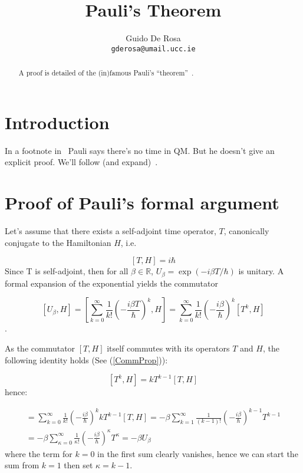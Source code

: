 \documentclass[a4paper,12pt]{article}
\author{Guido De Rosa \\ \small\tt{gderosa@umail.ucc.ie}}
\title{Pauli's Theorem}
\begin{document}
\maketitle

\begin{abstract}
A proof is detailed of the (in)famous Pauli's ``theorem''~\cite[footnote~2]{PauliFootnote}.
\end{abstract}

\section{Introduction}

In a footnote in~\cite{PauliFootnote} Pauli says there's no time in QM. But he
doesn't give an explicit proof. We'll follow (and expand)~\cite{Galapon2002}.

\section{Proof of Pauli's formal argument}\label{proof}

Let's assume that there exists a self-adjoint time operator, $T$, canonically conjugate
to the Hamiltonian $H$, i.e.

$$
\label{THcommutator}
[T, H] = i\hbar
$$
Since T is self-adjoint, then for all
$\beta\in\mathbb{R}$, $U_{\beta} = \exp(- i \beta T / \hbar)$
is unitary. A formal
expansion of the exponential yields the commutator

$$
[U_{\beta}, H]  = 
\left[
    \sum_{k=0}^{\infty} \frac{1}{k!} \left(- \frac{i\beta T}{\hbar} \right)^k, H
\right]         =
\sum_{k=0}^{\infty} \frac{1}{k!} \left(- \frac{i\beta}{\hbar} \right)^k [T^k, H]
$$.

As the commutator $[T, H]$ itself commutes with its operators $T$ and $H$,
the following identity holds (See (\ref{CommProp})):

$$
[T^k, H] = kT^{k-1}[T, H]
$$
hence:

\begin{multline}
[U_{\beta}, H]  = 
\sum_{k=0}^{\infty} \frac{1}{k!} \left(- \frac{i\beta}{\hbar} \right)^k kT^{k-1}[T, H] =
-\beta\sum_{k=1}^{\infty} \frac{1}{(k-1)!} \left(- \frac{i\beta}{\hbar} \right)^{k-1} T^{k-1} \\ =
-\beta\sum_{\kappa=0}^{\infty} \frac{1}{\kappa!} \left(- \frac{i\beta}{\hbar} \right)^{\kappa} T^{\kappa} =
-\beta U_{\beta}
\end{multline}
where the term for $k=0$ in the first sum clearly vanishes, hence we can start the sum from 
$k=1$ then set $\kappa=k-1$.
\end{document}
